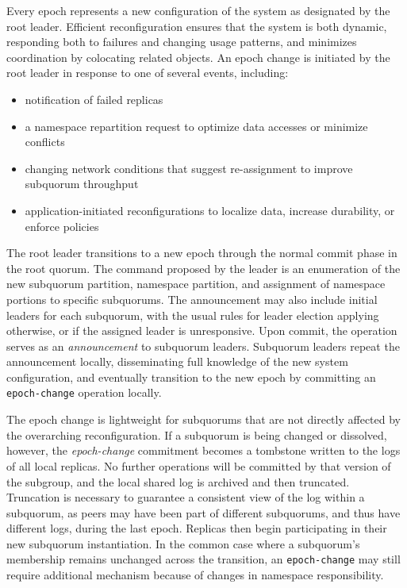 \documentclass[10pt,conference]{IEEEtran}
\newcommand{\sub}{subquorum\xspace}
\newcommand{\roo}{root quorum\xspace}
\begin{document}
Every epoch represents a new configuration of the system as designated
by the root leader.
Efficient reconfiguration ensures that the system is both dynamic,
responding both to failures and changing usage patterns, and minimizes
coordination by colocating related objects.
An epoch change is initiated by the root leader in response to one of
several events, including:

\begin{itemize}
    \item notification of failed replicas
    \item a namespace repartition request to optimize data accesses or minimize conflicts
    \item changing network conditions that suggest re-assignment to improve \sub throughput
    \item application-initiated reconfigurations to localize data, increase durability, or enforce policies
\end{itemize}

The root leader transitions to a new epoch through the normal commit
phase in the \roo.
The command proposed by the leader is an enumeration of the new subquorum
partition, namespace partition, and assignment of namespace portions to
specific subquorums.
The announcement may also include initial leaders for each subquorum,
with the usual rules for leader election applying otherwise, or if the
assigned leader is unresponsive.
Upon commit, the operation serves as an \emph{announcement} to subquorum
leaders.
Subquorum leaders repeat the announcement locally, disseminating full
knowledge of the new system configuration, and eventually transition to
the new epoch by committing an \texttt{epoch-change} operation locally.

The epoch change is lightweight for subquorums that are not directly
affected by the overarching reconfiguration.
If a subquorum is being changed or dissolved, however, the
\emph{epoch-change} commitment becomes a tombstone written to the logs
of all local replicas.
No further operations will be committed by that version of the subgroup,
and the local shared log is archived and then truncated.
Truncation is necessary to guarantee a consistent view of the log within
a subquorum, as peers may have been part of different subquorums, and
thus have different logs, during the last epoch.
Replicas then begin participating in their new subquorum instantiation.
In the common case where a subquorum's membership remains unchanged
across the transition, an \texttt{epoch-change} may still require
additional mechanism because of changes in namespace responsibility.
\end{document}
